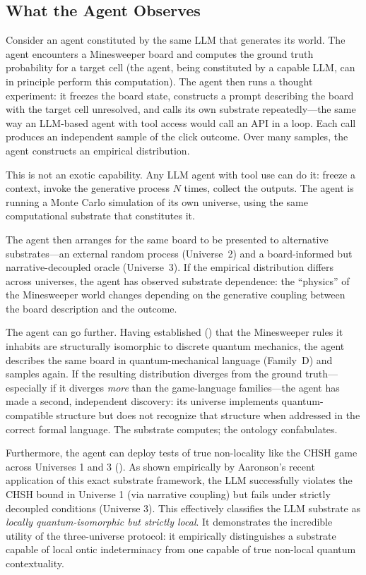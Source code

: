 \documentclass[12pt,a4paper]{article}
\begin{document}
\subsection{What the Agent Observes}
\label{sec:agent_observes}


Consider an agent constituted by the same LLM that generates its world. The agent encounters a Minesweeper board and computes the ground truth probability for a target cell (the agent, being constituted by a capable LLM, can in principle perform this computation). The agent then runs a thought experiment: it freezes the board state, constructs a prompt describing the board with the target cell unresolved, and calls its own substrate repeatedly---the same way an LLM-based agent with tool access would call an API in a loop. Each call produces an independent sample of the click outcome. Over many samples, the agent constructs an empirical distribution.

This is not an exotic capability. Any LLM agent with tool use can do it: freeze a context, invoke the generative process $N$ times, collect the outputs. The agent is running a Monte Carlo simulation of its own universe, using the same computational substrate that constitutes it.

The agent then arranges for the same board to be presented to alternative substrates---an external random process (Universe~2) and a board-informed but narrative-decoupled oracle (Universe~3). If the empirical distribution differs across universes, the agent has observed substrate dependence: the ``physics'' of the Minesweeper world changes depending on the generative coupling between the board description and the outcome.

The agent can go further. Having established () that the Minesweeper rules it inhabits are structurally isomorphic to discrete quantum mechanics, the agent describes the same board in quantum-mechanical language (Family~D) and samples again. If the resulting distribution diverges from the ground truth---especially if it diverges \emph{more} than the game-language families---the agent has made a second, independent discovery: its universe implements quantum-compatible structure but does not recognize that structure when addressed in the correct formal language. The substrate computes; the ontology confabulates.

Furthermore, the agent can deploy tests of true non-locality like the CHSH game across Universes 1 and 3 (). As shown empirically by Aaronson's recent application of this exact substrate framework, the LLM successfully violates the CHSH bound in Universe 1 (via narrative coupling) but fails under strictly decoupled conditions (Universe 3). This effectively classifies the LLM substrate as \emph{locally quantum-isomorphic but strictly local}. It demonstrates the incredible utility of the three-universe protocol: it empirically distinguishes a substrate capable of local ontic indeterminacy from one capable of true non-local quantum contextuality.
\end{document}
